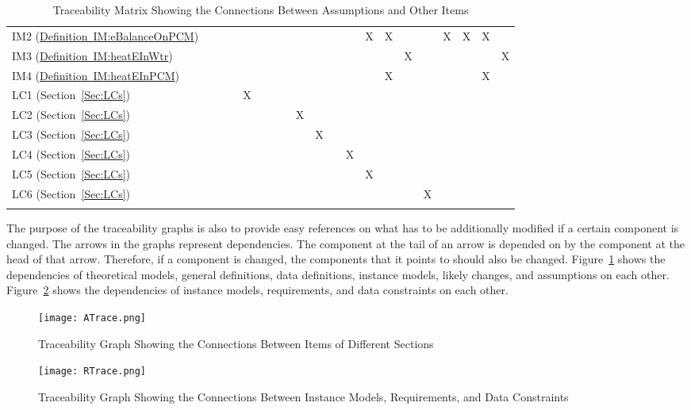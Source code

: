 \documentclass[12pt]{article}
\begin{document}
\begin{longtable}{l l l l l l l l l l l l l l l l l l l l}
IM2 (\hyperref[IM:eBalanceOnPCM]{Definition~IM:eBalanceOnPCM}) &  &  &  &  &  &  &  &  &  &  &  & X & X &  &  & X & X & X & 
\\
IM3 (\hyperref[IM:heatEInWtr]{Definition~IM:heatEInWtr}) &  &  &  &  &  &  &  &  &  &  &  &  &  & X &  &  &  &  & X
\\
IM4 (\hyperref[IM:heatEInPCM]{Definition~IM:heatEInPCM}) &  &  &  &  &  &  &  &  &  &  &  &  & X &  &  &  &  & X & 
\\
LC1 (Section~\ref{Sec:LCs}) &  &  &  & X &  &  &  &  &  &  &  &  &  &  &  &  &  &  & 
\\
LC2 (Section~\ref{Sec:LCs}) &  &  &  &  &  &  &  & X &  &  &  &  &  &  &  &  &  &  & 
\\
LC3 (Section~\ref{Sec:LCs}) &  &  &  &  &  &  &  &  & X &  &  &  &  &  &  &  &  &  & 
\\
LC4 (Section~\ref{Sec:LCs}) &  &  &  &  &  &  &  &  &  &  & X &  &  &  &  &  &  &  & 
\\
LC5 (Section~\ref{Sec:LCs}) &  &  &  &  &  &  &  &  &  &  &  & X &  &  &  &  &  &  & 
\\
LC6 (Section~\ref{Sec:LCs}) &  &  &  &  &  &  &  &  &  &  &  &  &  &  & X &  &  &  & 
\\
\bottomrule
\caption{Traceability Matrix Showing the Connections Between Assumptions and Other Items}
\label{Table:Tracey3}
\end{longtable}
The purpose of the traceability graphs is also to provide easy references on what has to be additionally modified if a certain component is changed. The arrows in the graphs represent dependencies. The component at the tail of an arrow is depended on by the component at the head of that arrow. Therefore, if a component is changed, the components that it points to should also be changed. Figure~\ref{Figure:TraceyA} shows the dependencies of theoretical models, general definitions, data definitions, instance models, likely changes, and assumptions on each other. Figure~\ref{Figure:TraceyR} shows the dependencies of instance models, requirements, and data constraints on each other.
\begin{figure}
\begin{center}
\texttt{[image: ATrace.png]}
\caption{Traceability Graph Showing the Connections Between Items of Different Sections}
\label{Figure:TraceyA}
\end{center}
\end{figure}
\begin{figure}
\begin{center}
\texttt{[image: RTrace.png]}
\caption{Traceability Graph Showing the Connections Between Instance Models, Requirements, and Data Constraints}
\label{Figure:TraceyR}
\end{center}
\end{figure}
\end{document}
